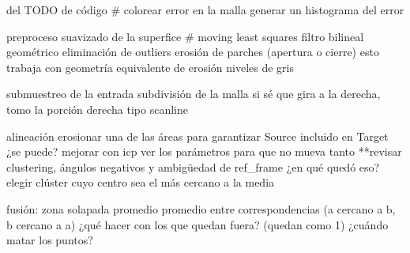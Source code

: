 del TODO de código
	# colorear error en la malla
	generar un histograma del error

	preproceso
		suavizado de la superfice
			# moving least squares
			filtro bilineal
			geométrico
		eliminación de outliers
			erosión de parches (apertura o cierre)
				esto trabaja con geometría
			equivalente de erosión niveles de gris

	submuestreo de la entrada
		subdivisión de la malla
			si sé que gira a la derecha, tomo la porción derecha
				tipo scanline

	alineación
		erosionar una de las áreas para garantizar Source incluido en Target
			¿se puede?
		mejorar con icp
			ver los parámetros para que no mueva tanto
		**revisar clustering, ángulos negativos y ambigüedad de ref_frame
			¿en qué quedó eso?
			elegir clúster cuyo centro sea el más cercano a la media

	fusión:
		zona solapada promedio
			promedio entre correspondencias (a cercano a b, b cercano a a)
				¿qué hacer con los que quedan fuera? (quedan como 1)
				¿cuándo matar los puntos?
